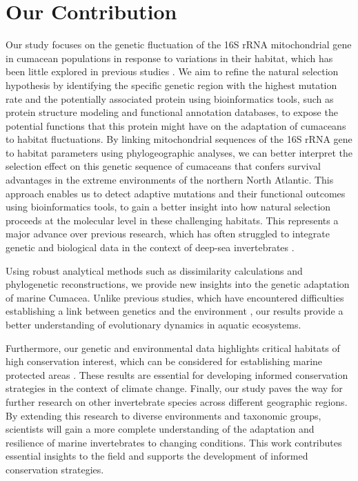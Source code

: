 \section{Our Contribution}\label{contribution}
Our study focuses on the genetic fluctuation of the 16S rRNA mitochondrial gene in cumacean populations in response to variations in their habitat, which has been little explored in previous studies \citep{grassle1992deep, rex2000latitudinal}. We aim to refine the natural selection hypothesis by identifying the specific genetic region with the highest mutation rate and the potentially associated protein using bioinformatics tools, such as protein structure modeling and functional annotation databases, to expose the potential functions that this protein might have on the adaptation of cumaceans to habitat fluctuations. By linking mitochondrial sequences of the 16S rRNA gene to habitat parameters using phylogeographic analyses, we can better interpret the selection effect on this genetic sequence of cumaceans that confers survival advantages in the extreme environments of the northern North Atlantic. This approach enables us to detect adaptive mutations and their functional outcomes using bioinformatics tools, to gain a better insight into how natural selection proceeds at the molecular level in these challenging habitats. This represents a major advance over previous research, which has often struggled to integrate genetic and biological data in the context of deep-sea invertebrates \citep{etter1990population, vrijenhoek2009cryptic}.

Using robust analytical methods such as dissimilarity calculations and phylogenetic reconstructions, we provide new insights into the genetic adaptation of marine Cumacea. Unlike previous studies, which have encountered difficulties establishing a link between genetics and the environment \citep{manel2003landscape, balkenhol2009statistical}, our results provide a better understanding of evolutionary dynamics in aquatic ecosystems.

Furthermore, our genetic and environmental data highlights critical habitats of high conservation interest, which can be considered for establishing marine protected areas \citep{levin2009ecological}. These results are essential for developing informed conservation strategies in the context of climate change. Finally, our study paves the way for further research on other invertebrate species across different geographic regions. By extending this research to diverse environments and taxonomic groups, scientists will gain a more complete understanding of the adaptation and resilience of marine invertebrates to changing conditions. This work contributes essential insights to the field and supports the development of informed conservation strategies.

